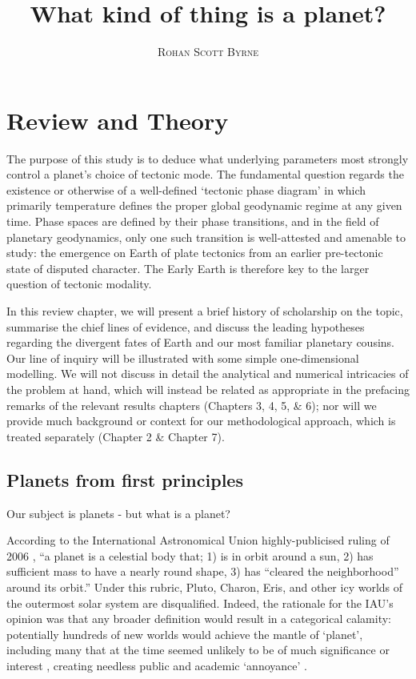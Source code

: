\documentclass[a4paper,11pt,oneside]{book}
\title{\Huge \textbf{What kind of thing is a planet?}}
\author{\textsc{Rohan Scott Byrne}}
\begin{document}
\sloppy

\frontmatter
\maketitle

\tableofcontents

\mainmatter

% 
% 

\section{Review and Theory}

The purpose of this study is to deduce what underlying parameters most strongly control a planet's choice of tectonic mode. The fundamental question regards the existence or otherwise of a well-defined `tectonic phase diagram' in which primarily temperature defines the proper global geodynamic regime at any given time. Phase spaces are defined by their phase transitions, and in the field of planetary geodynamics, only one such transition is well-attested and amenable to study: the emergence on Earth of plate tectonics from an earlier pre-tectonic state of disputed character. The Early Earth is therefore key to the larger question of tectonic modality.

In this review chapter, we will present a brief history of scholarship on the topic, summarise the chief lines of evidence, and discuss the leading hypotheses regarding the divergent fates of Earth and our most familiar planetary cousins. Our line of inquiry will be illustrated with some simple one-dimensional modelling. We will not discuss in detail the analytical and numerical intricacies of the problem at hand, which will instead be related as appropriate in the prefacing remarks of the relevant results chapters (Chapters 3, 4, 5, \& 6); nor will we provide much background or context for our methodological approach, which is treated separately (Chapter 2 \& Chapter 7).

\subsection{Planets from first principles}

Our subject is planets - but what is a planet?

According to the International Astronomical Union highly-publicised ruling of 2006 \cite{International_Astronomical_Union2006-ft}, ``a planet is a celestial body that; 1) is in orbit around a sun, 2) has sufficient mass to have a nearly round shape, 3) has ``cleared the neighborhood'' around its orbit.'' Under this rubric, Pluto, Charon, Eris, and other icy worlds of the outermost solar system are disqualified. Indeed, the rationale for the IAU's opinion was that any broader definition would result in a categorical calamity: potentially hundreds of new worlds would achieve the mantle of `planet', including many that at the time seemed unlikely to be of much significance or interest \cite{Sarma2008-wu}, creating needless public and academic `annoyance' \cite{Basri2006-vw}.
\end{document}
